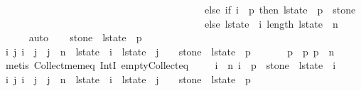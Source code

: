 \begin{isabellebody}
\ \ \ \ \ \ \ \ \ \ \ \ \ \ \ \ \ \ \ \ \ \ \ \ \ \ \ \ \ \ \ \ \ \ \ \ \ \ \ \ \ else\ if\ i\ {\isacharequal}\ p{}\ then\ l{\isacharunderscore}state\ {\isacharbang}\ p{}\ {\isasymunion}\ {\isacharbraceleft}stone{\isacharbraceright}\isanewline
\ \ \ \ \ \ \ \ \ \ \ \ \ \ \ \ \ \ \ \ \ \ \ \ \ \ \ \ \ \ \ \ \ \ \ \ \ \ \ \ \ else\ l{\isacharunderscore}state\ {\isacharbang}\ i{\isacharparenright}{\isachardoublequoteclose}\ {\isachardoublequoteopen}length\ l{\isacharunderscore}state{\isacharprime}\ {\isacharequal}\ n\ {\isacharplus}\ {}{\isachardoublequoteclose}\isanewline
\ \ \ \ \isamarkupfalse%
\ auto\isanewline
\isanewline
\ \ \isamarkupfalse%
\ {\isachardoublequoteopen}stone\ {\isasymnotin}\ l{\isacharunderscore}state\ {\isacharbang}\ p{}{\isachardoublequoteclose}\ \isanewline
\ \ \ \ \isamarkupfalse%
\ {\isacharbackquoteopen}{\isasymforall}i\ j{\isachardot}\ i\ {\isacharless}\ j\ {\isasymand}\ j\ {\isasymle}\ n\ {\isasymlongrightarrow}\ l{\isacharunderscore}state\ {\isacharbang}\ i\ {\isasyminter}\ l{\isacharunderscore}state\ {\isacharbang}\ j\ {\isacharequal}\ {\isacharbraceleft}{\isacharbraceright}{\isacharbackquoteclose}\ \ {\isacharbackquoteopen}stone\ {\isasymin}\ l{\isacharunderscore}state\ {\isacharbang}\ p{}{\isacharbackquoteclose}\ \isanewline
\ \ \ \ \isamarkupfalse%
\ {\isacharbackquoteopen}p{}\ {\isacharless}\ p{}{\isacharbackquoteclose}\ {\isacharbackquoteopen}p{}\ {\isasymle}\ n{\isacharbackquoteclose}\isanewline
\ \ \ \ \isamarkupfalse%
\ {\isacharparenleft}metis\ Collect{\isacharunderscore}mem{\isacharunderscore}eq\ IntI\ empty{\isacharunderscore}Collect{\isacharunderscore}eq{\isacharparenright}\isanewline
\isanewline
\ \ \isamarkupfalse%
\ {\isachardoublequoteopen}{\isasymforall}\ i\ {\isasymle}\ n{\isachardot}\ i\ {\isasymnoteq}\ p{}\ {\isasymlongrightarrow}\ stone\ {\isasymnotin}\ l{\isacharunderscore}state\ {\isacharbang}\ i{\isachardoublequoteclose}\isanewline
\ \ \ \ \isamarkupfalse%
\ {\isacharbackquoteopen}{\isasymforall}i\ j{\isachardot}\ i\ {\isacharless}\ j\ {\isasymand}\ j\ {\isasymle}\ n\ {\isasymlongrightarrow}\ l{\isacharunderscore}state\ {\isacharbang}\ i\ {\isasyminter}\ l{\isacharunderscore}state\ {\isacharbang}\ j\ {\isacharequal}\ {\isacharbraceleft}{\isacharbraceright}{\isacharbackquoteclose}\ \ {\isacharbackquoteopen}stone\ {\isasymin}\ l{\isacharunderscore}state\ {\isacharbang}\ p{}{\isacharbackquoteclose}\ \isanewline

\end{isabellebody}
